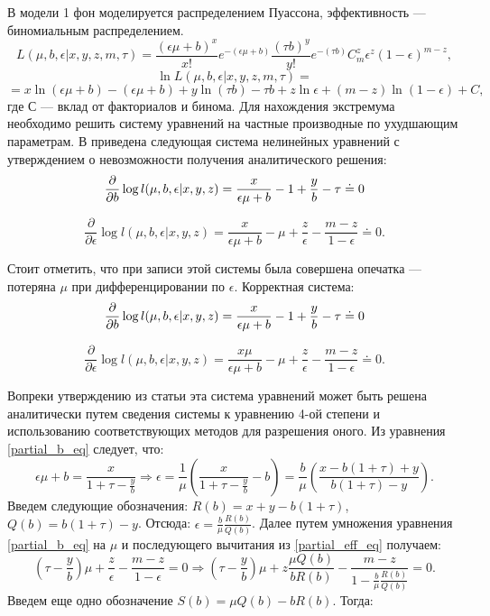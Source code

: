 \documentclass[14pt]{article}
\begin{document}
В модели 1 фон моделируется распределением Пуассона, эффективность --- биномиальным распределением.
$$L(\mu, b, \epsilon | x, y, z, m, \tau) = \frac{\left(\epsilon \mu + b\right)^x}{x!} e^{-\left(\epsilon \mu + b\right)} \frac{\left(\tau b\right)^y}{y!} e^{-\left(\tau b\right)} C_m^z \epsilon^z \left(1 - \epsilon\right)^{m-z} ,$$
$$\ln L(\mu, b, \epsilon | x, y, z, m, \tau) = $$
$$ = x\ln \left(\epsilon \mu + b\right) -\left(\epsilon \mu + b\right) + y\ln \left(\tau b\right) - \tau b + z \ln \epsilon + \left(m - z\right) \ln \left(1 - \epsilon\right) + C ,$$
где $\text{С}$ --- вклад от факториалов и бинома. 
Для нахождения экстремума необходимо решить систему уравнений на частные производные по ухудшающим параметрам. 
В \cite{Rolke_paper} приведена следующая система нелинейных уравнений с утверждением о невозможности получения аналитического решения:
\begin{equation*}
    \frac{\partial }{\partial b}\log l(\mu ,b,\epsilon|x,y,z)=\frac{x}{\epsilon\mu +b}-1+\frac{%
    y}{b}-\tau \doteq 0
\end{equation*}
    
\begin{equation*}
    \frac{\partial }{\partial \epsilon}\log l(\mu ,b,\epsilon|x,y,z)=\frac{x}{\epsilon\mu +b}-\mu +%
    \frac{z}{\epsilon}-\frac{m-z}{1-\epsilon}\doteq 0 .
\end{equation*}

Стоит отметить, что при записи этой системы была совершена опечатка --- потеряна $\mu$ при дифференцировании по $\epsilon$. Корректная система: 
\begin{equation} \label{partial_b_eq}
    \frac{\partial }{\partial b}\log l(\mu ,b,\epsilon|x,y,z)=\frac{x}{\epsilon\mu +b}-1+\frac{%
    y}{b}-\tau \doteq 0
\end{equation}
    
\begin{equation} \label{partial_eff_eq}
    \frac{\partial }{\partial \epsilon}\log l(\mu ,b,\epsilon|x,y,z)=\frac{x \mu}{\epsilon\mu +b}-\mu +%
    \frac{z}{\epsilon}-\frac{m-z}{1-\epsilon}\doteq 0 .
\end{equation}

Вопреки утверждению из статьи \cite{Rolke_paper} эта система уравнений может быть решена аналитически путем сведения системы к уравнению 4-ой степени и использованию соответствующих методов для разрешения оного.
Из уравнения \ref{partial_b_eq} следует, что:
$$\epsilon \mu + b = \frac{x}{1 + \tau - \frac{y}{b}} \Rightarrow \epsilon = \frac{1}{\mu} \left(\frac{x}{1 + \tau - \frac{y}{b}} - b\right) = \frac{b}{\mu} \left( \frac{x - b \left(1 + \tau\right) + y}{b \left(1 + \tau \right) - y}\right) .$$
Введем следующие обозначения: $R(b) = x + y - b \left(1 + \tau\right)$, $Q(b) = b \left(1 + \tau\right) - y$. Отсюда: $\epsilon = \frac{b}{\mu} \frac{R(b)}{Q(b)}$.
Далее путем умножения уравнения \ref{partial_b_eq} на $\mu$  и последующего вычитания из  \ref{partial_eff_eq} получаем:
$$\left(\tau - \frac{y}{b}\right) \mu + \frac{z}{\epsilon} - \frac{m - z}{1 - \epsilon} = 0 \Rightarrow \left(\tau - \frac{y}{b}\right) \mu + z\frac{\mu Q(b)}{b R(b)} - \frac{m - z}{1 - \frac{b}{\mu} \frac{R(b)}{Q(b)}} = 0 .$$
Введем еще одно обозначение $S(b) = \mu Q(b) - b R(b)$. Тогда:
\end{document}

